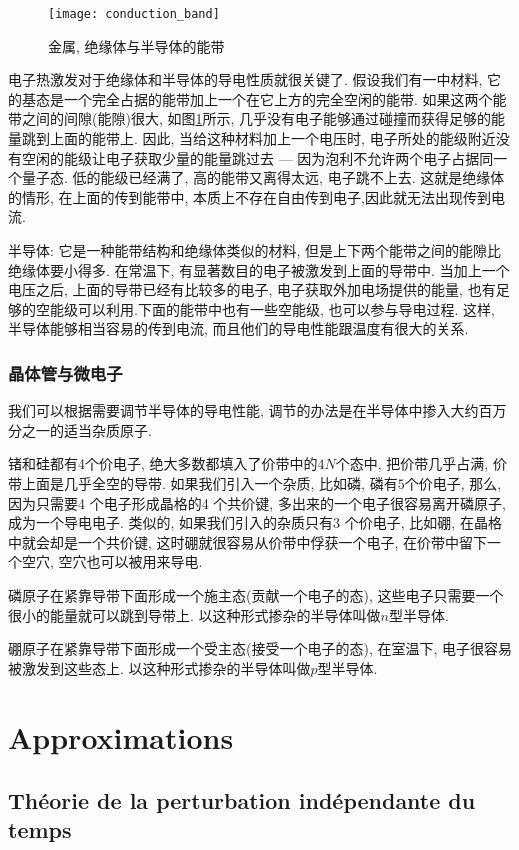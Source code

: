 \documentclass{article}
\begin{document}
\begin{figure}[htbp]
		\centering
		\texttt{[image: conduction\_band]}
		\caption{金属, 绝缘体与半导体的能带}
		\label{fig.paoli.conduction}
\end{figure}
电子热激发对于绝缘体和半导体的导电性质就很关键了.
假设我们有一中材料, 它的基态是一个完全占据的能带加上一个在它上方的完全空闲的能带.
如果这两个能带之间的间隙(能隙)很大, 如图\ref{fig.paoli.conduction}所示, 几乎没有电子能够通过碰撞而获得足够的能量跳到上面的能带上.
因此, 当给这种材料加上一个电压时, 电子所处的能级附近没有空闲的能级让电子获取少量的能量跳过去 --- 因为泡利不允许两个电子占据同一个量子态.
低的能级已经满了, 高的能带又离得太远, 电子跳不上去. 这就是绝缘体的情形, 在上面的传到能带中, 本质上不存在自由传到电子,因此就无法出现传到电流.

半导体: 它是一种能带结构和绝缘体类似的材料, 但是上下两个能带之间的能隙比绝缘体要小得多. 在常温下, 有显著数目的电子被激发到上面的导带中.
当加上一个电压之后, 上面的导带已经有比较多的电子, 电子获取外加电场提供的能量, 也有足够的空能级可以利用.下面的能带中也有一些空能级, 也可以参与导电过程.
这样, 半导体能够相当容易的传到电流, 而且他们的导电性能跟温度有很大的关系.

\subsubsection{晶体管与微电子}
我们可以根据需要调节半导体的导电性能, 调节的办法是在半导体中掺入大约百万分之一的适当杂质原子.

锗和硅都有4个价电子, 绝大多数都填入了价带中的$4N$个态中, 把价带几乎占满, 价带上面是几乎全空的导带.
如果我们引入一个杂质, 比如磷, 磷有$5$个价电子, 那么, 因为只需要4 个电子形成晶格的4 个共价键, 多出来的一个电子很容易离开磷原子, 成为一个导电电子.
类似的, 如果我们引入的杂质只有3 个价电子, 比如硼, 在晶格中就会却是一个共价键, 这时硼就很容易从价带中俘获一个电子, 在价带中留下一个空穴, 空穴也可以被用来导电.

磷原子在紧靠导带下面形成一个施主态(贡献一个电子的态), 这些电子只需要一个很小的能量就可以跳到导带上. 以这种形式掺杂的半导体叫做$n$型半导体.\par
硼原子在紧靠导带下面形成一个受主态(接受一个电子的态), 在室温下, 电子很容易被激发到这些态上. 以这种形式掺杂的半导体叫做$p$型半导体.

\section{Approximations}
\subsection{Th\'eorie de la perturbation ind\'ependante du temps}
\end{document}
